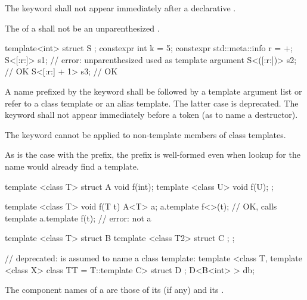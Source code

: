 \pnum
The keyword  shall not appear immediately after
a declarative .

\pnum
The  of a 
shall not be an unparenthesized .
\begin{example}
\begin{codeblock}
template<int> struct S { };
constexpr int k = 5;
constexpr std::meta::info r = ^^k;
S<[:r:]> s1;                        // error: unparenthesized  used as template argument
S<([:r:])> s2;                      // OK
S<[:r:] + 1> s3;                    // OK
\end{codeblock}
\end{example}

\pnum
A name prefixed by the keyword
shall be followed by a template argument list or
refer to a class template or an alias template.
The latter case is deprecated.
The keyword  shall not appear immediately
before a \tcode{\~} token (as to name a destructor).
\begin{note}
The keyword
cannot be applied to non-template members of class templates.
\end{note}
\begin{note}
As is the case with the
prefix, the
prefix is well-formed
even when lookup for the name would already find a template.
\end{note}
\begin{example}
\begin{codeblock}
template <class T> struct A {
  void f(int);
  template <class U> void f(U);
};

template <class T> void f(T t) {
  A<T> a;
  a.template f<>(t);                    // OK, calls template
  a.template f(t);                      // error: not a 
}

template <class T> struct B {
  template <class T2> struct C { };
};

// deprecated:  is assumed to name a class template:
template <class T, template <class X> class TT = T::template C> struct D { };
D<B<int> > db;
\end{codeblock}
\end{example}

\pnum
The component names of a  are
those of its  (if any) and
its .

